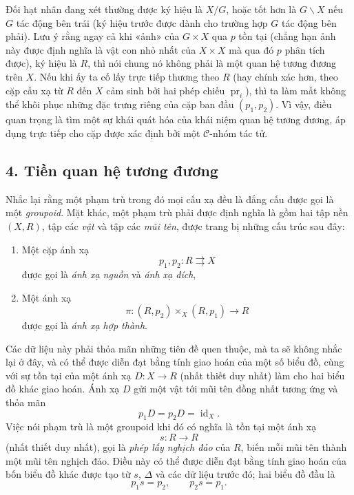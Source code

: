 \documentclass[11pt,twoside,openany]{book}
\numberwithin{equation}{section}
\newcommand{\src}[1]{%
  \phantomsection\hypertarget{src:\fgasourceid:#1}{}%
  \marginpar{\raggedleft\footnotesize\sffamily #1}%
}
\newcommand{\fgasourceid}{unset}
\begin{document}
Đối hạt nhân đang xét thường được ký hiệu là $X/G$, hoặc tốt hơn là
$G\backslash X$ nếu $G$ tác động bên trái (ký hiệu trước được dành cho trường
hợp $G$ tác động bên phải). Lưu ý rằng ngay cả khi «ảnh» của $G\times X$ qua
$p$ tồn tại (chẳng hạn ảnh này được định nghĩa là vật con nhỏ nhất của
$X\times X$ mà qua đó $p$ phân tích được), ký hiệu là $R$, thì nói chung nó
không phải là một quan hệ tương đương trên $X$. Nếu khi ấy ta cố lấy trực tiếp
thương theo $R$ (hay chính xác hơn, theo cặp cấu xạ từ $R$ đến $X$ cảm sinh bởi
hai phép chiếu $\operatorname{pr}_i$), thì ta làm mất không thể khôi phục
những đặc trưng riêng của cặp ban đầu $(p_1,p_2)$. Vì vậy, điều quan trọng là
tìm một sự khái quát hóa của khái niệm quan hệ tương đương, áp dụng trực tiếp
cho cặp được xác định bởi một $\mathcal C$-nhóm tác tử.

\subsection*{4. Tiền quan hệ tương đương}

Nhắc lại rằng một phạm trù trong đó mọi cấu xạ đều là đẳng cấu được gọi là một
\emph{groupoid}. Mặt khác, một phạm trù phải được định nghĩa là gồm hai tập nền
$(X,R)$, tập các \emph{vật} và tập các \emph{mũi tên}, được trang bị những cấu
trúc sau đây:
\src{106}
\begin{enumerate}
\item[(i)] Một cặp ánh xạ
\[
  p_1,p_2:R\rightrightarrows X
\]
được gọi là \emph{ánh xạ nguồn} và \emph{ánh xạ đích},

\item[(ii)] Một ánh xạ
\[
  \pi:(R,p_2)\times_X(R,p_1)\longrightarrow R
\]
được gọi là \emph{ánh xạ hợp thành}.
\end{enumerate}
Các dữ liệu này phải thỏa mãn những tiên đề quen thuộc, mà ta sẽ không nhắc
lại ở đây, và có thể được diễn đạt bằng tính giao hoán của một số biểu đồ,
cùng với sự tồn tại của một ánh xạ $D:X\to R$ (nhất thiết duy nhất) làm cho
hai biểu đồ khác giao hoán. Ánh xạ $D$ gửi một vật tới mũi tên đồng nhất tương ứng
và thỏa mãn
\[
  p_1D=p_2D=\operatorname{id}_X.
\]
Việc nói phạm trù là một groupoid khi đó có nghĩa là tồn tại một ánh xạ
\[
  s:R\longrightarrow R
\]
(nhất thiết duy nhất), gọi là \emph{phép lấy nghịch đảo} của $R$, biến mỗi
mũi tên thành một mũi tên nghịch đảo. Điều này có thể được diễn đạt bằng tính
giao hoán của bốn biểu đồ khác được tạo từ $s$, $\Delta$ và các dữ liệu trước
đó; hai biểu đồ đầu là
\[
  p_1s=p_2,\qquad p_2s=p_1.
\]
\end{document}

